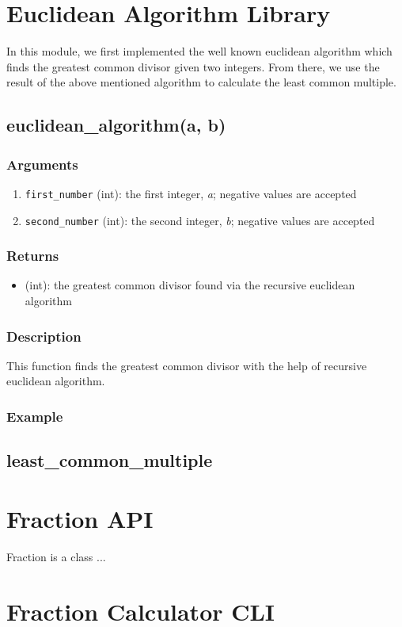 \documentclass[refman]{article}
\begin{document}
\section{Euclidean Algorithm Library}

In this module, we first implemented the well known euclidean algorithm which finds the greatest common divisor given two integers. From there, we use the result of the above mentioned algorithm to calculate the least common multiple.

\subsection*{euclidean\_algorithm(a, b)}

\subsubsection*{Arguments}

\begin{enumerate}
  \item \texttt{first\_number} (int): the first integer, \textit{a}; negative values are accepted
  \item \texttt{second\_number} (int): the second integer, \textit{b}; negative values are accepted
\end{enumerate}

\subsubsection*{Returns}

\begin{itemize}
  \item (int): the greatest common divisor found via the recursive euclidean algorithm
\end{itemize}

\subsubsection*{Description}

This function finds the greatest common divisor with the help of recursive euclidean algorithm.


\subsubsection*{Example}

\subsection*{least\_common\_multiple}

\section{Fraction API}

Fraction is a class ...

\subsection{}

\section{Fraction Calculator CLI}
\end{document}
